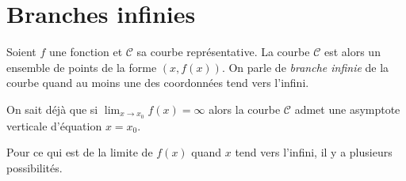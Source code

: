 \section{Branches infinies}
      Soient $f$ une fonction et $\mathscr{C}$ sa courbe repr\'esentative.
      La courbe $\mathscr{C}$ est alors un ensemble de points de la forme $(x,f(x))$.
      On parle de \emph{branche infinie} de la courbe quand au moins une des coordonn\'ees tend vers l'infini.
            
      On sait d\'ej\`a que si $\lim_{x\rightarrow x_0} f(x) = \infty$ alors 
      la courbe $\mathscr{C}$ admet une asymptote verticale d'\'equation $x=x_0$.
      
      Pour ce qui est de la limite de $f(x)$ quand $x$ tend vers l'infini, il y a plusieurs possibilit\'es.
